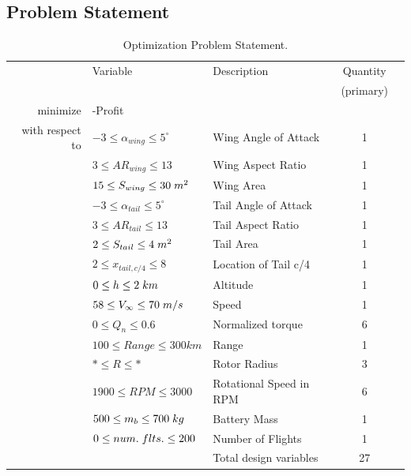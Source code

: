 \documentclass[conf]{new-aiaa}
\begin{document}
\pagebreak
\subsection{Problem Statement}
\begin{table}[!hbt]
    \centering
    \caption{Optimization Problem Statement.}
    \begin{tabular}{r l l c c}
        \hline
        & Variable & Description & Quantity\\
        &&& (primary)\\
        \hline
        minimize
        & -Profit \\
        \hline
        with respect to
        & $-3 \le \alpha_{wing} \le 5^{\circ}$ & Wing Angle of Attack & 1\\
        & $3 \le AR_{wing} \le 13$ & Wing Aspect Ratio & 1\\
        & $15 \le S_{wing} \le 30\hspace{1mm}m^{2}$ & Wing Area & 1\\
        & $-3 \le \alpha_{tail} \le 5^{\circ}$ & Tail Angle of Attack & 1 \\
        & $3 \le AR_{tail} \le 13$ & Tail Aspect Ratio & 1 \\
        & $2 \le S_{tail} \le 4\hspace{1mm}m^{2}$ & Tail Area & 1 \\
        & $2 \le x_{tail,c/4} \le 8$ & Location of Tail c/4 & 1 \\
        & $0 \le h \le 2\hspace{1mm}km$ & Altitude & 1 \\
        & $58 \le V_{\infty} \le 70\hspace{1mm}m/s$ & Speed & 1 \\
        & $0 \leq Q_n \leq 0.6$ & Normalized torque & 6 \\
        & $100 \leq Range \leq 300 km$ & Range & 1 \\
        & $* \le R \le *$ & Rotor Radius & 3 \\
        & $1900 \le RPM \le 3000$ & Rotational Speed in RPM & 6 \\
        & $500 \le m_{b} \le 700\hspace{1mm}kg$ & Battery Mass & 1 \\
        & $0 \le num.\hspace{1mm}flts. \le 200$ & Number of Flights & 1 \\
        \cline{3-5}
        && Total design variables & 27 \\

\end{tabular}
\end{table}
\end{document}
